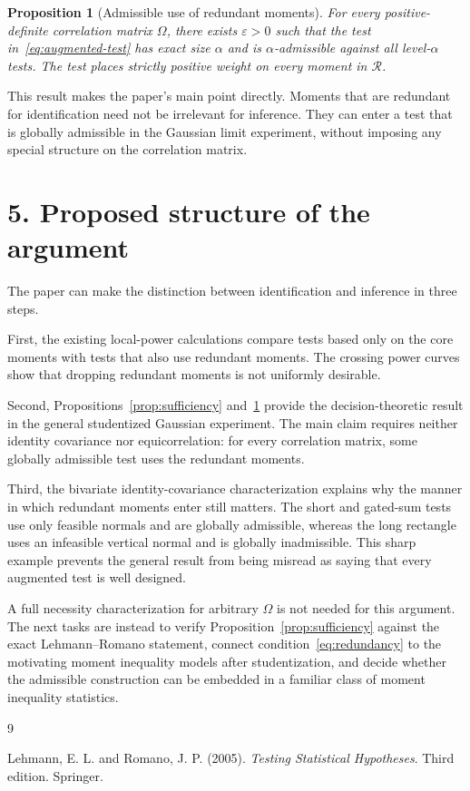 \documentclass[12pt]{article}
\newtheorem{proposition}{Proposition}
\theoremstyle{remark}
\begin{document}
\begin{proposition}[Admissible use of redundant moments]\label{prop:existence}
For every positive-definite correlation matrix $\Omega$, there exists
$\varepsilon>0$ such that the test in~\eqref{eq:augmented-test} has exact size $\alpha$
and is $\alpha$-admissible against all level-$\alpha$ tests.  The test places strictly
positive weight on every moment in $\mathcal R$.
\end{proposition}

This result makes the paper's main point directly.  Moments that are redundant for
identification need not be irrelevant for inference.  They can enter a test that is
globally admissible in the Gaussian limit experiment, without imposing any special
structure on the correlation matrix.

\section*{5. Proposed structure of the argument}

The paper can make the distinction between identification and inference in three
steps.

First, the existing local-power calculations compare tests based only on the core
moments with tests that also use redundant moments.  The crossing power curves show
that dropping redundant moments is not uniformly desirable.

Second, Propositions~\ref{prop:sufficiency} and~\ref{prop:existence} provide the
decision-theoretic result in the general studentized Gaussian experiment.  The main
claim requires neither identity covariance nor equicorrelation: for every correlation
matrix, some globally admissible test uses the redundant moments.

Third, the bivariate identity-covariance characterization explains why the manner in
which redundant moments enter still matters.  The short and gated-sum tests use only
feasible normals and are globally admissible, whereas the long rectangle uses an
infeasible vertical normal and is globally inadmissible.  This sharp example prevents
the general result from being misread as saying that every augmented test is well
designed.

A full necessity characterization for arbitrary $\Omega$ is not needed for this
argument.  The next tasks are instead to verify Proposition~\ref{prop:sufficiency}
against the exact Lehmann--Romano statement, connect condition~\eqref{eq:redundancy}
to the motivating moment inequality models after studentization, and decide whether
the admissible construction can be embedded in a familiar class of moment inequality
statistics.

\begin{thebibliography}{9}

Lehmann, E. L. and Romano, J. P. (2005).
\textit{Testing Statistical Hypotheses}. Third edition. Springer.

\end{thebibliography}
\end{document}
